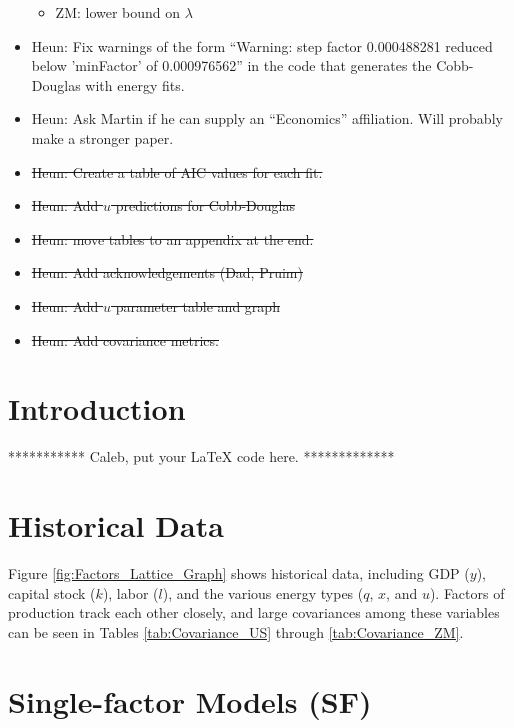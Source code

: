 \documentclass[preprint,authoryear,12pt]{elsarticle}\usepackage{graphicx, color}
\begin{document}
\begin{itemize}
\begin{itemize}
      \item ZM: lower bound on $\lambda$
      \end{itemize}
\item Heun: Fix warnings of the form ``Warning:  step factor 0.000488281 reduced below ’minFactor’ of 0.000976562'' in the code that generates the Cobb-Douglas with energy fits.
\item Heun: Ask Martin if he can supply an ``Economics'' affiliation. Will probably make a stronger paper.
\item \st{Heun: Create a table of AIC values for each fit.}
\item \st{Heun: Add $u$ predictions for Cobb-Douglas}
\item \st{Heun: move tables to an appendix at the end.}
\item \st{Heun: Add acknowledgements (Dad, Pruim)}
\item \st{Heun: Add $u$ parameter table and graph}
\item \st{Heun: Add covariance metrics.}
\end{itemize}

\section{Introduction}

*********** Caleb, put your LaTeX code here. *************









\section{Historical Data}

Figure \ref{fig:Factors_Lattice_Graph} shows historical data, including GDP ($y$), capital stock ($k$), labor ($l$), and the various energy types ($q$, $x$, and $u$). Factors of production track each other closely, and large covariances among these variables can be seen in Tables \ref{tab:Covariance_US} through \ref{tab:Covariance_ZM}.




\section{Single-factor Models (SF)}
\end{document}
